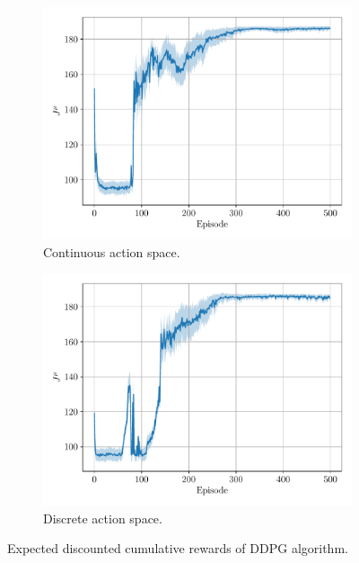 \documentclass[a4paper, 12pt]{article}
\begin{document}
    \begin{figure}[H]
        \centering
        \begin{subfigure}{0.49\textwidth}
            \centering
            \includegraphics[width=\textwidth]{resources/pdf/ddpg_J_None_1_0.95.pdf}
            \caption{Continuous action space.}
        \end{subfigure}
        \hfill
        \begin{subfigure}{0.49\textwidth}
            \centering
            \includegraphics[width=\textwidth]{resources/pdf/ddpg_J_11_1_0.95.pdf}
            \caption{Discrete action space.}
        \end{subfigure}
        \caption{Expected discounted cumulative rewards of DDPG algorithm.}
        \label{fig:ddpg.rewards}
    \end{figure}
    
\end{document}

